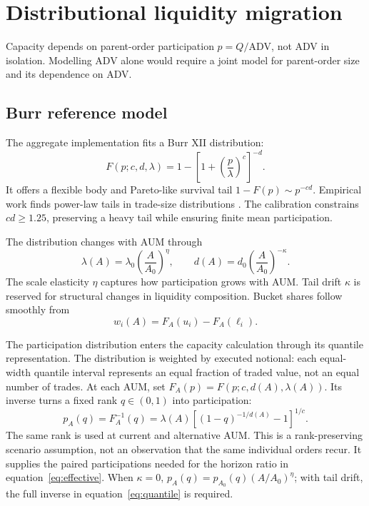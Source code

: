 \documentclass[11pt,a4paper]{article}
\numberwithin{equation}{section}
\begin{document}
\section{Distributional liquidity migration}\label{sec:migration}
Capacity depends on parent-order participation $p=Q/\mathrm{ADV}$, not ADV in isolation. Modelling
ADV alone would require a joint model for parent-order size and its dependence on ADV.

\subsection{Burr reference model}
The aggregate implementation fits a Burr XII distribution:
\begin{equation}\label{eq:burr}
 F(p;c,d,\lambda)=1-\left[1+\left(\frac{p}{\lambda}\right)^c\right]^{-d}.
\end{equation}
It offers a flexible body and Pareto-like survival tail $1-F(p)\sim p^{-cd}$. Empirical work finds
power-law tails in trade-size distributions \cite{rak2007}. The calibration constrains $cd\geq
1.25$, preserving a heavy tail while ensuring finite mean participation.

The distribution changes with AUM through
\begin{equation}\label{eq:scaling}
 \lambda(A)=\lambda_0\left(\frac{A}{A_0}\right)^\eta,
 \qquad
 d(A)=d_0\left(\frac{A}{A_0}\right)^{-\kappa}.
\end{equation}
The scale elasticity $\eta$ captures how participation grows with AUM. Tail drift $\kappa$ is
reserved for structural changes in liquidity composition. Bucket shares follow smoothly from
\begin{equation}\label{eq:weights}
 w_i(A)=F_A(u_i)-F_A(\ell_i).
\end{equation}


The participation distribution enters the capacity calculation through its quantile representation.
The distribution is weighted by executed notional: each equal-width quantile interval represents an equal fraction of
traded value, not an equal number of trades. At each AUM, set
$F_A(p)=F(p;c,d(A),\lambda(A))$. Its inverse turns a fixed rank $q\in(0,1)$ into participation:
\begin{equation}\label{eq:quantile}
 p_A(q)=F_A^{-1}(q)
 =\lambda(A)\left[(1-q)^{-1/d(A)}-1\right]^{1/c}.
\end{equation}
The same rank is used at current and alternative AUM. This is a rank-preserving scenario
assumption, not an observation that the same individual orders recur. It supplies the paired
participations needed for the horizon ratio in equation~\eqref{eq:effective}. When $\kappa=0$,
$p_A(q)=p_{A_0}(q)(A/A_0)^\eta$; with tail drift, the full inverse in
equation~\eqref{eq:quantile} is required.
\end{document}

